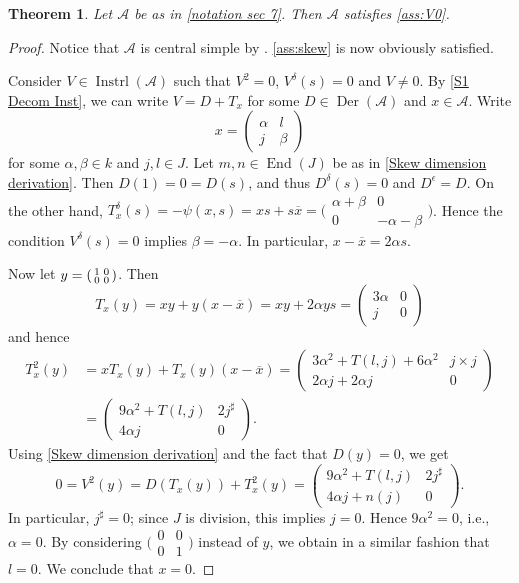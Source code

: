 \documentclass[oneside,a4paper]{amsart} %
\newtheorem{theorem}{Theorem}[section]
\theoremstyle{definition}
\DeclareMathOperator{\Inst}{Instrl}
\DeclareMathOperator{\Der}{Der}
\DeclareMathOperator{\End}{End}
\newcommand{\A}{\mathcal{A}}
\numberwithin{equation}{section}
\begin{document}
\begin{theorem}
\label{Hexagon Assumption (i)}
    Let $\A$ be as in \cref{notation sec 7}. Then $\A$ satisfies \cref{ass:V0}.
\end{theorem}
\begin{proof}
	Notice that $\A$ is central simple by \cite[\S 4, Lemma 2.1]{Allison1984}. 
	\cref{ass:skew} is now obviously satisfied.
	
	Consider $V\in\Inst(\A)$ such that $V^2=0$, $V^\delta(s)=0$ and $V\neq 0$.
	By \cref{S1 Decom Inst}, we can write $V = D+T_x$ for some $D\in\Der(\A)$ and $x\in \A$. Write
	\[ x= \begin{pmatrix}
		\alpha & l \\ j & \beta
	\end{pmatrix} \]
	for some $\alpha,\beta\in k$ and $j,l\in J$.
	Let $m,n \in \End(J)$ be as in \cref{Skew dimension derivation}.
	Then $D(1)=0=D(s)$, and thus $D^\delta(s)=0$ and $D^\epsilon=D$. On the other hand, $T_x^\delta(s)=-\psi(x,s)=xs+s\overline x=\bigl ( \begin{smallmatrix}  \alpha+\beta&0\\0&-\alpha-\beta \end{smallmatrix}\bigr )$. Hence the condition $V^\delta(s)=0$ implies $\beta=-\alpha$. In particular, $x - \overline x = 2\alpha s$.
	
	Now let $y = \begin{psmallmatrix} 1&0\\0&0\end{psmallmatrix}$. Then
	\[ T_x(y) = xy+y(x-\overline x) = xy+2\alpha ys = \begin{pmatrix}
		3\alpha &0\\j&0 
	\end{pmatrix} \]
	and hence
	\begin{align*}
	T_x^2(y) &= x T_x(y) + T_x(y) (x-\overline x) = \begin{pmatrix}
		3\alpha^2+ T(l,j) +6\alpha^2 & j\times j\\ 2\alpha j+2\alpha j &0
	\end{pmatrix} \\ 
	&=\begin{pmatrix} 9\alpha^2+ T(l,j)& 2 j^\sharp \\ 4\alpha j & 0\end{pmatrix}.	
	\end{align*}
	Using \cref{Skew dimension derivation} and the fact that $D(y) = 0$, we get 
	\[ 0 = V^2(y) = D(T_x(y)) + T_x^2(y) =  \begin{pmatrix} 9\alpha^2+ T(l,j)& 2 j^\sharp \\ 4\alpha j+n(j) & 0\end{pmatrix} . \]
    In particular, $j^\sharp = 0$; since $J$ is division, this implies $j=0$. Hence $9\alpha^2=0$, i.e., $\alpha=0$. 
	By considering $\bigl (\begin{smallmatrix}0&0\\0&1\end{smallmatrix}\bigr )$ instead of $y$, we obtain in a similar fashion that $l=0$. We conclude that $x=0$.
	

\end{proof}
\end{document}
